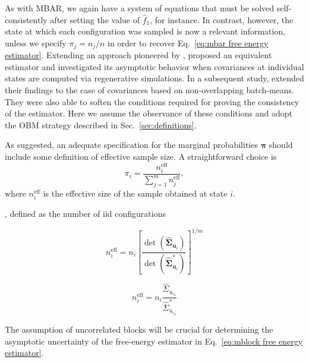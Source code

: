 \documentclass[journal=jctcce,manuscript=article,layout=twocolumn]{achemso}
\newcommand{\mt}[1]{\boldsymbol{\mathbf{#1}}}   %
\newcommand{\vt}[1]{\boldsymbol{\mathbf{#1}}}   %
\begin{document}
As with MBAR, we again have a system of equations that must be solved self-consistently after setting the value of $\hat f_1$, for instance. In contrast, however, the state at which each configuration was sampled is now a relevant information, unless we specify $\pi_j = {n_j}/{n}$ in order to recover Eq.~\eqref{eq:mbar free energy estimator}. Extending an approach pioneered by \citeauthor{Geyer_1994} \cite{Geyer_1994}, \citeauthor{Doss_2014} \cite{Doss_2014} proposed an equivalent estimator and investigated its asymptotic behavior when covariances at individual states are computed via regenerative simulations. In a subsequent study, \citeauthor{Roy_2018} \cite{Roy_2018} extended their findings to the case of covariances based on non-overlapping batch-means. They were also able to soften the conditions required for proving the consistency of the estimator. Here we assume the observance of these conditions and adopt the OBM strategy described in Sec.~\ref{sec:definitions}. 

As \citeauthor{Roy_2018} \cite{Roy_2018} suggested, an adequate specification for the marginal probabilities $\vt \pi$ should include some definition of effective sample size. A straightforward choice is
\begin{equation}
\label{eq:mblock prior}
\pi_i = \frac{n^\text{eff}_i}{\sum_{j=1}^m n^\text{eff}_j},
\end{equation}
where $n^\text{eff}_i$ is the effective size of the sample obtained at state $i$.

, defined as the number of iid configurations 

\begin{equation*}
n^\text{eff}_i = n_i \left[\frac{\det(\hat{\mt \Sigma}_{\overline{\vt u}_i})}{\det(\hat{\mt \Sigma}^\ast_{\overline{\vt u}_i})}\right]^{1/m}
\end{equation*}

\begin{equation*}
n^\text{eff}_i = n_i \frac{\hat{\Sigma}_{\overline{u_i}_i}}{\hat{\Sigma}^\ast_{\overline{u_i}_i}}
\end{equation*}

The assumption of uncorrelated blocks will be crucial for determining the asymptotic uncertainty of the free-energy estimator in Eq.~\eqref{eq:mblock free energy estimator}.
\end{document}
